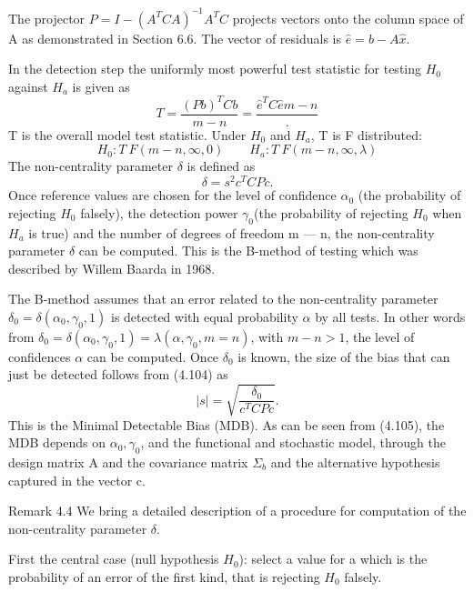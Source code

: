 	The projector $P=I-(A^TCA)^{-1}A^TC$ projects vectors onto the column space of
	A as demonstrated in Section 6.6. The vector of residuals is $\hat{e}=b-A\hat{x}$.
	
	In the detection step the uniformly most powerful test statistic for testing $H_0$ against
	$H_a$ is given as 
	\begin{equation}
	T=\frac{(Pb)^TCb}{m-n}=\frac{\hat{e}^TC\hat{e}{m-n}}.
	\end{equation}
	T is the overall model test statistic. Under $H_0$ and $H_a$, T is F distributed:
	\begin{equation*}
	H_0:T~F(m-n,\infty ,0) \qquad H_a:T~F(m-n,\infty ,\lambda)
	\end{equation*}	 
	The non-centrality parameter $\delta$ is defined as
	\begin{equation}
	\delta=s^2c^TCPc.
	\end{equation}
	Once reference values are chosen for the level of confidence $\alpha_0$ (the probability of rejecting $H_0$ falsely), the detection power $\gamma_0$(the probability of rejecting $H_0$  when $H_a$ is true) and the number of degrees of freedom m — n, the non-centrality parameter $\delta$ can be computed. This is the B-method of testing which was described by Willem Baarda in 1968.
	
	The B-method assumes that an error related to the non-centrality parameter $\delta_0=\delta(\alpha_0,\gamma_0,1)$ is detected with equal probability $\alpha$ by all tests. In other words from $\delta_0=\delta(\alpha_0,\gamma_0,1)=\lambda(\alpha,\gamma_0,m=n)$, with $m-n>1$, the level of confidences $\alpha$ can be computed.
	Once $\delta_0$ is known, the size of the bias that can just be detected follows from (4.104) as
	\begin{equation}
	|s|=\sqrt{\frac{\delta_0}{c^TCPc}}.
	\end{equation}
	This is the Minimal Detectable Bias (MDB). As can be seen from (4.105), the MDB depends on $\alpha_0,\gamma_0$, and the functional and stochastic model, through the design matrix A and
	the covariance matrix $\Sigma_b$ and the alternative hypothesis captured in the vector c.
	
	Remark 4.4\; We bring a detailed description of a procedure for computation of the non-centrality parameter $\delta$.
	
	First the central case (null hypothesis $H_0$): select a value for a which is the probability of an error of the first kind, that is rejecting $H_0$ falsely.
	
